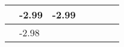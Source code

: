 \documentclass[a4paper,11pt]{report}
\begin{document}
\begin{table}[H]
\begin{center}
\begin{tabular}{|l|l|l|l|l|l|l|}
\hline
\hspace*{0.5cm}&\hspace*{0.5cm}-2.99&\hspace*{0.5cm}-2.99&\hspace*{0.5cm}&\hspace*{0.5cm}&\hspace*{0.5cm}\\
\hline
\hspace*{0.5cm}&\hspace*{0.5cm}-2.98&\hspace*{0.5cm}&\hspace*{0.5cm}&\hspace*{0.5cm}&\hspace*{0.5cm}\\
\hline
\end{tabular}
\label{table5}
\end{center}
\end{table}
\end{document}
